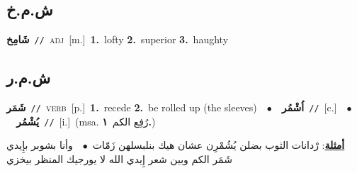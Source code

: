 \documentclass[10pt,a4paper,twoside]{article} %
\begin{document}
\begin{multicols}{2}
\vspace{-3mm}
\subsection*{\color{blue}\foreignlanguage{arabic}{ش.م.خ}\color{blue}{}} 

{\setlength\topsep{0pt}\textbf{\foreignlanguage{arabic}{شَامِخ}}\ {\color{gray}\texttt{//}\color{black}}\ \textsc{adj}\ [m.]\ \textbf{1.}~lofty  \textbf{2.}~superior  \textbf{3.}~haughty\ } \vspace{2mm}

\vspace{-3mm}
\subsection*{\color{blue}\foreignlanguage{arabic}{ش.م.ر}\color{blue}{}} 

{\setlength\topsep{0pt}\textbf{\foreignlanguage{arabic}{شَمَر}}\ {\color{gray}\texttt{//}\color{black}}\ \textsc{verb}\ [p.]\ \textbf{1.}~recede  \textbf{2.}~be rolled up (the sleeves)\ \ $\bullet$\ \ \setlength\topsep{0pt}\textbf{\foreignlanguage{arabic}{اُشْمُر}}\ {\color{gray}\texttt{//}\color{black}}\ [c.]\ \ $\bullet$\ \ \setlength\topsep{0pt}\textbf{\foreignlanguage{arabic}{يُشْمُر}}\ {\color{gray}\texttt{//}\color{black}}\ [i.]\ \color{gray}(msa. \foreignlanguage{arabic}{رُفِع الكم}~\foreignlanguage{arabic}{\textbf{١.}})\color{black}\  \begin{flushright}\color{gray}\foreignlanguage{arabic}{\textbf{\underline{\foreignlanguage{arabic}{أمثلة}}}: رْدانات الثوب بضلن يُشُمْرِن عشان هيك بنلبسلهن زَمّات\ $\bullet$\ \  وأنا بشوبر بإِيدي شَمَر الكم وبين شعر إِيدي الله لا يورجيك المنظر بيخزي}\end{flushright}\color{black}} \vspace{2mm}


\end{multicols}
\end{document}
